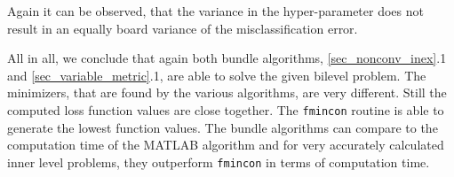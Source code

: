 Again it can be observed, that the variance in the hyper-parameter does not result in an equally board variance of the misclassification error.

All in all, we conclude that again both bundle algorithms, \ref{sec_nonconv_inex}.1 and \ref{sec_variable_metric}.1, are able to solve the given bilevel problem.
The minimizers, that are found by the various algorithms, are very different. Still the computed loss function values are close together. The \texttt{fmincon} routine is able to generate the lowest function values.
The bundle algorithms can compare to the computation time of the MATLAB algorithm and for very accurately calculated inner level problems, they outperform \texttt{fmincon} in terms of computation time.










%
%
%
%
%



